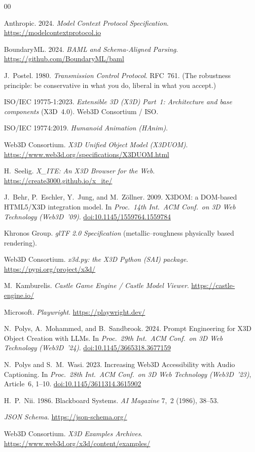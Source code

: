 \documentclass[sigconf,nonacm,screen,anonymous]{acmart}
\begin{document}
\balance


\begin{thebibliography}{00}
\providecommand{\doi}[1]{\href{https://doi.org/#1}{doi:#1}}

 Anthropic. 2024. \emph{Model Context Protocol Specification}.
\url{https://modelcontextprotocol.io}

 BoundaryML. 2024. \emph{BAML and Schema-Aligned Parsing}.
\url{https://github.com/BoundaryML/baml}

 J.~Postel. 1980. \emph{Transmission Control Protocol}. RFC~761.
(The robustness principle: be conservative in what you do, liberal in what you
accept.)

 ISO/IEC 19775-1:2023. \emph{Extensible 3D (X3D) Part~1:
Architecture and base components} (X3D~4.0). Web3D Consortium / ISO.

 ISO/IEC 19774:2019. \emph{Humanoid Animation (HAnim)}.

 Web3D Consortium. \emph{X3D Unified Object Model (X3DUOM)}.
\url{https://www.web3d.org/specifications/X3DUOM.html}

 H.~Seelig. \emph{X\_ITE: An X3D Browser for the Web}.
\url{https://create3000.github.io/x_ite/}

 J.~Behr, P.~Eschler, Y.~Jung, and M.~Z\"ollner. 2009. X3DOM: a
DOM-based HTML5/X3D integration model. In \emph{Proc.\ 14th Int.\ ACM Conf.\ on
3D Web Technology (Web3D~'09)}. \doi{10.1145/1559764.1559784}

 Khronos Group. \emph{glTF 2.0 Specification} (metallic--roughness
physically based rendering).

 Web3D Consortium. \emph{x3d.py: the X3D Python (SAI) package}.
\url{https://pypi.org/project/x3d/}

 M.~Kambur\-elis. \emph{Castle Game Engine / Castle Model Viewer}.
\url{https://castle-engine.io/}

 Microsoft. \emph{Playwright}. \url{https://playwright.dev/}

 N.~Polys, A.~Mohammed, and B.~Sandbrook. 2024. Prompt Engineering for X3D Object Creation with LLMs. In \emph{Proc.\ 29th Int.\ ACM Conf.\ on 3D Web Technology (Web3D~'24)}. \doi{10.1145/3665318.3677159}

 N.~Polys and S.~M.~Wasi. 2023. Increasing Web3D
Accessibility with Audio Captioning. In \emph{Proc.\ 28th Int.\ ACM Conf.\ on 3D
Web Technology (Web3D~'23)}, Article~6, 1--10. \doi{10.1145/3611314.3615902}

 H.~P.~Nii. 1986. Blackboard Systems. \emph{AI Magazine}
7,~2 (1986), 38--53.

 \emph{JSON Schema}. \url{https://json-schema.org/}

 Web3D Consortium. \emph{X3D Examples Archives}.
\url{https://www.web3d.org/x3d/content/examples/}

\end{thebibliography}
\end{document}
